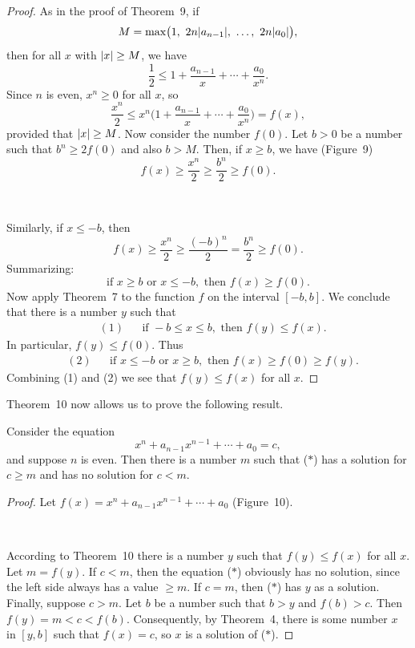 \begin{proof}
As in the proof of Theorem~9, if
\[
M=\max\bigl(1,\ 2n\abs{a_{n-1}},\ \dots,\ 2n\abs{a_0}\bigr),
\]
then for all $x$ with $\lvert x\rvert\geq M$, we have
\[
\frac12 \leq 1 + \frac{a_{n-1}}{x} + \cdots + \frac{a_0}{x^n}.
\]
Since $n$ is even, $x^n\geq 0$ for all $x$, so
\[
\frac{x^n}{2}
\leq x^n\Biggl(1 + \frac{a_{n-1}}{x} + \cdots + \frac{a_0}{x^n}\Biggr)
= f(x),
\]
provided that $\lvert x\rvert\geq M$. Now consider the number $f(0)$. Let $b>0$ be a
number such that $b^n\geq 2f(0)$ and also $b>M$. Then, if $x\geq b$, we have
(Figure~9)
\[
f(x)\geq \frac{x^n}{2}\geq \frac{b^n}{2}\geq f(0).
\]
\begin{center}
\\[0.6em]
\end{center}
Similarly, if $x\leq -b$, then
\[
f(x)\geq \frac{x^n}{2}\geq \frac{(-b)^n}{2}=\frac{b^n}{2}\geq f(0).
\]
Summarizing:
\[
\text{if } x\geq b \text{ or } x\leq -b, \text{ then } f(x)\geq f(0).
\]
Now apply Theorem~7 to the function $f$ on the interval $[-b,b]$. We conclude
that there is a number $y$ such that
\begin{align*}
&(1) & &\text{if } -b\leq x\leq b, \text{ then } f(y)\leq f(x).
\end{align*}
In particular, $f(y)\leq f(0)$. Thus
\begin{align*}
&(2) & &\text{if } x\leq -b \text{ or } x\geq b, \text{ then }
  f(x)\geq f(0)\geq f(y).
\end{align*}
Combining (1) and (2) we see that $f(y)\leq f(x)$ for all $x$.
\end{proof}

Theorem~10 now allows us to prove the following result.

\begin{theorem}
Consider the equation
\begin{equation*}
x^n + a_{n-1}x^{n-1} + \cdots + a_0 = c, \tag{$*$}
\end{equation*}
and suppose $n$ is even. Then there is a number $m$ such that ($*$) has a
solution for $c\geq m$ and has no solution for $c<m$.
\end{theorem}

\begin{proof}
Let $f(x)=x^n+a_{n-1}x^{n-1}+\cdots+a_0$ (Figure~10).
\begin{center}
\\[0.6em]
\end{center}
According to Theorem~10 there is a number $y$ such that $f(y)\leq f(x)$ for all
$x$. Let $m=f(y)$. If $c<m$, then the equation ($*$) obviously has no
solution, since the left side always has a value $\geq m$. If $c=m$, then
($*$) has $y$ as a solution. Finally, suppose $c>m$. Let $b$ be a number such
that $b>y$ and $f(b)>c$. Then $f(y)=m<c<f(b)$. Consequently, by Theorem~4,
there is some number $x$ in $[y,b]$ such that $f(x)=c$, so $x$ is a solution of
($*$).
\end{proof}

